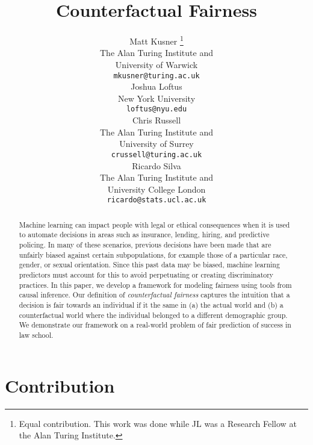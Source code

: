 \documentclass{article}
\title{Counterfactual Fairness}
\author{
  Matt Kusner \thanks{Equal contribution. This work was done while JL was a Research Fellow at the Alan Turing Institute.}\\
  The Alan Turing Institute and \\
  University of Warwick \\
  \texttt{mkusner@turing.ac.uk} \\
  \And
  Joshua Loftus \samethanks\\
  New York University \\
  \texttt{loftus@nyu.edu} \\
  \And
  Chris Russell \samethanks \\
  The Alan Turing Institute and \\
  University of Surrey\\
  \texttt{crussell@turing.ac.uk} \\
  \And
  Ricardo Silva \\
  The Alan Turing Institute and \\
  University College London\\
  \texttt{ricardo@stats.ucl.ac.uk} \\
}
\begin{document}
\maketitle




\begin{abstract} 
  Machine learning can impact people with legal or ethical
  consequences when it is used
  to automate decisions in areas such as insurance, lending, hiring,
  and predictive policing.  In many of these scenarios,
  previous decisions have been made that are unfairly biased against
  certain subpopulations, for example those of a particular race, gender, or
  sexual orientation.  Since this past data may be biased,
  machine learning predictors must account for this to avoid
  perpetuating or creating discriminatory practices.
  In this paper, we develop a framework for modeling fairness
  using tools from causal inference. Our definition of
  \emph{counterfactual fairness} captures the
  intuition that a decision is fair towards an individual if it 
  the same in (a) the actual world and (b) a counterfactual world
  where the individual belonged to a different demographic
  group. We demonstrate our framework on a real-world problem of fair
  prediction of success in law school.
\end{abstract} 

\section{Contribution}
\label{sec:introduction}

\end{document}
